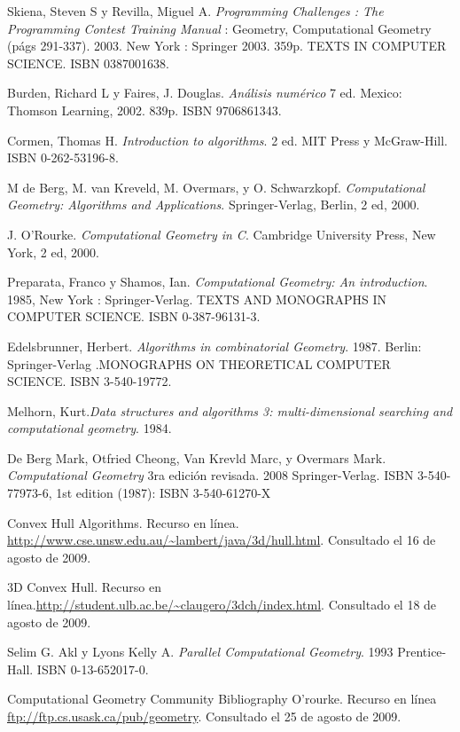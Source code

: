 \documentclass[final, 12pt letterpaper]{article}
\begin{document}
\begin{thebibliography}{20}
Skiena, Steven S y Revilla, Miguel A. \emph{Programming Challenges : The Programming Contest Training Manual} : Geometry, Computational Geometry (págs 291-337). 2003. New York : Springer 2003. 359p. TEXTS IN COMPUTER SCIENCE.  ISBN 0387001638.

Burden, Richard L y Faires, J. Douglas.\emph{ Análisis numérico} 7 ed. Mexico: Thomson Learning, 2002. 839p. ISBN 9706861343.

Cormen, Thomas H. \emph{Introduction to algorithms}. 2 ed. MIT Press y McGraw-Hill. ISBN 0-262-53196-8.

M de Berg, M. van Kreveld, M. Overmars, y O. Schwarzkopf. \emph{Computational
Geometry: Algorithms and Applications}. Springer-Verlag, Berlin, 2 ed, 2000.

J. O’Rourke. \emph{Computational Geometry in C}. Cambridge University Press, New
York, 2 ed, 2000.

Preparata, Franco y Shamos, Ian. \emph{Computational Geometry: An introduction}. 1985, New York : Springer-Verlag. TEXTS AND MONOGRAPHS IN COMPUTER SCIENCE. ISBN 0-387-96131-3.

Edelsbrunner, Herbert. \emph{Algorithms in combinatorial Geometry}. 1987. Berlin: Springer-Verlag .MONOGRAPHS ON THEORETICAL COMPUTER SCIENCE. ISBN 3-540-19772.

Melhorn, Kurt.\emph{Data structures and algorithms 3: multi-dimensional searching and computational geometry}. 1984.

De Berg Mark, Otfried Cheong, Van Krevld Marc, y Overmars Mark. \emph{Computational Geometry} 3ra edición revisada. 2008 Springer-Verlag. ISBN 3-540-77973-6, 1st edition (1987): ISBN 3-540-61270-X

Convex Hull Algorithms. Recurso en línea. 
\newblock \url{http://www.cse.unsw.edu.au/~lambert/java/3d/hull.html}. Consultado el 16 de agosto de 2009.

3D Convex Hull. Recurso en línea.\newblock \url{http://student.ulb.ac.be/~claugero/3dch/index.html}. Consultado el 18 de agosto de 2009.

Selim G. Akl y Lyons Kelly A. \emph{Parallel Computational Geometry}. 1993 Prentice-Hall. ISBN 0-13-652017-0.

Computational Geometry Community Bibliography O'rourke. Recurso en línea
\newblock \url{ftp://ftp.cs.usask.ca/pub/geometry}. Consultado el 25 de agosto de 2009.


\end{thebibliography}
\end{document}

